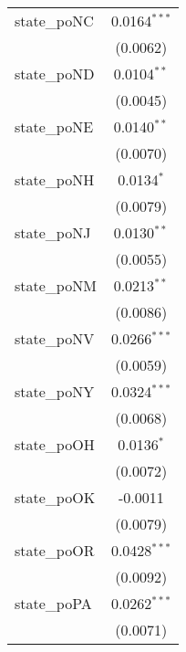 \begin{tabular}{lc}
   state\_poNC                                        & 0.0164$^{***}$\\   
                                                      & (0.0062)\\   
   state\_poND                                        & 0.0104$^{**}$\\   
                                                      & (0.0045)\\   
   state\_poNE                                        & 0.0140$^{**}$\\   
                                                      & (0.0070)\\   
   state\_poNH                                        & 0.0134$^{*}$\\   
                                                      & (0.0079)\\   
   state\_poNJ                                        & 0.0130$^{**}$\\   
                                                      & (0.0055)\\   
   state\_poNM                                        & 0.0213$^{**}$\\   
                                                      & (0.0086)\\   
   state\_poNV                                        & 0.0266$^{***}$\\   
                                                      & (0.0059)\\   
   state\_poNY                                        & 0.0324$^{***}$\\   
                                                      & (0.0068)\\   
   state\_poOH                                        & 0.0136$^{*}$\\   
                                                      & (0.0072)\\   
   state\_poOK                                        & -0.0011\\   
                                                      & (0.0079)\\   
   state\_poOR                                        & 0.0428$^{***}$\\   
                                                      & (0.0092)\\   
   state\_poPA                                        & 0.0262$^{***}$\\   
                                                      & (0.0071)\\   

\end{tabular}
